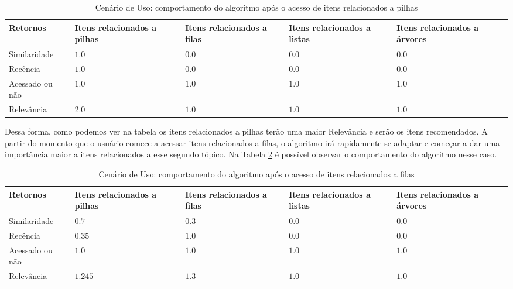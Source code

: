 \begin{table}[hp]
\footnotesize
\caption[Cenário de Uso: comportamento do algoritmo após o acesso de itens relacionados a pilhas]{Cenário de Uso: comportamento do algoritmo após o acesso de itens relacionados a pilhas}
\label{tab:cenario-de-uso-1}
\centering
\begin{tabular}{|p{2cm}|p{3cm}|p{3cm}|p{3cm}|p{3cm}|}
  \hline
  \textbf{Retornos} & \textbf{Itens relacionados a pilhas} & \textbf{Itens relacionados a filas} & \textbf{Itens relacionados a listas} & \textbf{Itens relacionados a árvores} \\
  \hline
  Similaridade & $1.0$ & $0.0$ & $0.0$ & $0.0$ \\
  \hline
  Recência & $1.0$ & $0.0$ & $0.0$ & $0.0$ \\
  \hline
  Acessado ou não & $1.0$ & $1.0$ & $1.0$ & $1.0$ \\
  \hline
  Relevância & $2.0$ & $1.0$ & $1.0$ & $1.0$ \\
  \hline
\end{tabular}
\end{table}

Dessa forma, como podemos ver na tabela os itens relacionados a pilhas terão uma maior Relevância e serão os itens recomendados.
A partir do momento que o usuário comece a acessar itens relacionados a filas, o algoritmo irá rapidamente se adaptar
e começar a dar uma importância maior a itens relacionados a esse segundo tópico. Na Tabela \ref{tab:cenario-de-uso-2}
é possível observar o comportamento do algoritmo nesse caso.

\begin{table}[hp]
\footnotesize
\caption[Cenário de Uso: comportamento do algoritmo após o acesso de itens relacionados a filas]{Cenário de Uso: comportamento do algoritmo após o acesso de itens relacionados a filas}
\label{tab:cenario-de-uso-2}
\centering
\begin{tabular}{|p{2cm}|p{3cm}|p{3cm}|p{3cm}|p{3cm}|}
  \hline
  \textbf{Retornos} & \textbf{Itens relacionados a pilhas} & \textbf{Itens relacionados a filas} & \textbf{Itens relacionados a listas} & \textbf{Itens relacionados a árvores} \\
  \hline
  Similaridade & $0.7$ & $0.3$ & $0.0$ & $0.0$ \\
  \hline
  Recência & $0.35$ & $1.0$ & $0.0$ & $0.0$ \\
  \hline
  Acessado ou não & $1.0$ & $1.0$ & $1.0$ & $1.0$ \\
  \hline
  Relevância & $1.245$ & $1.3$ & $1.0$ & $1.0$ \\
  \hline
\end{tabular}
\end{table}

